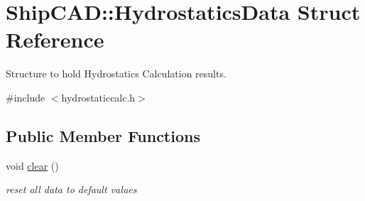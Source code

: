 \hypertarget{structShipCAD_1_1HydrostaticsData}{}\section{Ship\+C\+AD\+:\+:Hydrostatics\+Data Struct Reference}
\label{structShipCAD_1_1HydrostaticsData}


Structure to hold Hydrostatics Calculation results.  




{\ttfamily \#include $<$hydrostaticcalc.\+h$>$}

\subsection*{Public Member Functions}
\begin{DoxyCompactItemize}
\item 
void \hyperlink{structShipCAD_1_1HydrostaticsData_a7ea81ac589a3b24424b4176c734c7a37}{clear} ()
\begin{DoxyCompactList}\small\item\em reset all data to default values \end{DoxyCompactList}\end{DoxyCompactItemize}
